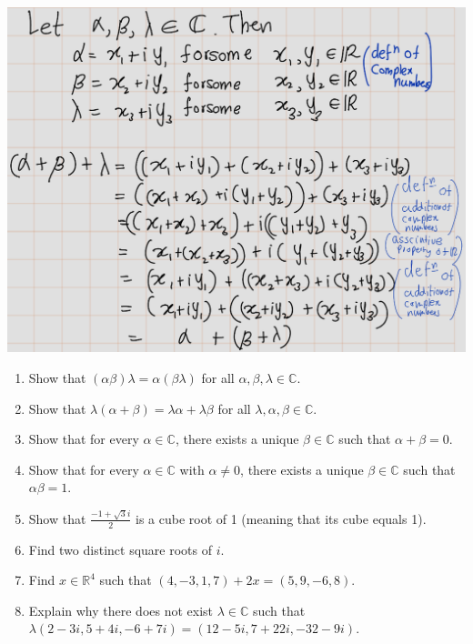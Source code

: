 \documentclass[
]{book}
\theoremstyle{definition}
\theoremstyle{definition}
\theoremstyle{definition}
\theoremstyle{definition}
\theoremstyle{remark}
\begin{document}
\includegraphics[width=14.89in]{fig/Ex1A/Ex2}

\begin{enumerate}
\def\labelenumi{\arabic{enumi}.}
\setcounter{enumi}{2}
\item
  Show that \((\alpha \beta)\lambda = \alpha(\beta \lambda)\) for all \(\alpha, \beta, \lambda \in \mathbb{C}\).
\item
  Show that \(\lambda(\alpha + \beta) = \lambda\alpha + \lambda\beta\) for all \(\lambda, \alpha, \beta \in \mathbb{C}\).
\item
  Show that for every \(\alpha \in \mathbb{C}\), there exists a unique \(\beta \in \mathbb{C}\) such that \(\alpha + \beta = 0\).
\item
  Show that for every \(\alpha \in \mathbb{C}\) with \(\alpha \neq 0\), there exists a unique \(\beta \in \mathbb{C}\) such that \(\alpha\beta = 1\).
\item
  Show that \(\frac{-1 + \sqrt{3}i}{2}\) is a cube root of 1 (meaning that its cube equals 1).
\item
  Find two distinct square roots of \(i\).
\item
  Find \(x \in \mathbb{R}^4\) such that \((4, -3, 1, 7) + 2x = (5, 9, -6, 8)\).
\item
  Explain why there does not exist \(\lambda \in \mathbb{C}\) such that \(\lambda(2 - 3i, 5 + 4i, -6 + 7i) = (12 - 5i, 7 + 22i, -32 - 9i)\).
\end{enumerate}

  
\end{document}
